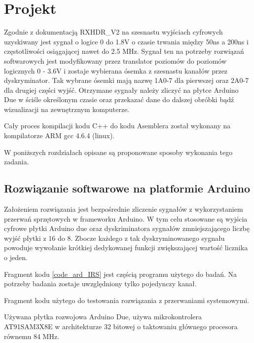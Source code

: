 \documentclass[a4paper,12pt]{article}
\begin{document}
\newpage
\section{Projekt}

Zgodnie z dokumentacją RXHDR\_V2 \cite{master} na szesnastu wyjściach cyfrowych uzyskiwany jest sygnał o logice 0 do 1.8V o czasie trwania między 50ns a 200ns i częstotliwości osiągającej nawet do 2.5 MHz.
Sygnał ten na potrzeby rozwiązań softwarowych jest modyfikowany przez translator poziomów do poziomów logicznych 0 - 3.6V i zostaje wybierana ósemka z szesnastu kanałów przez dyskryminator.   
Tak wybrane ósemki mają nazwę 1A0-7 dla pierwszej oraz 2A0-7 dla drugiej części wyjść.   
Otrzymane sygnały należy zliczyć na płytce Arduino Due w ściśle określonym czasie oraz przekazać dane do dalszej obróbki bądź wizualizacji na zewnętrznym komputerze.

Cały proces kompilacji kodu C++ do kodu Asemblera został wykonany na kompilatorze ARM gcc 4.6.4 (linux). 

W poniższych rozdziałach opisane są proponowane sposoby wykonania tego zadania. 

\subsection{Rozwiązanie softwarowe na platformie Arduino}
\label{dzial arduino}
Założeniem rozwiązania jest bezpośrednie zliczenie sygnałów z wykorzystaniem przerwań sprzętowych w frameworku Arduino. W tym celu stosowane są wyjścia cyfrowe płytki Arduino due oraz dyskriminatora sygnałów zmniejszającego liczbę wyjść płytki z 16 do 8.
Zbocze każdego z tak dyskryminowanego sygnału  powoduje wywołanie krótkiej dedykowanej funkcji zwiększającej wartość licznika o jeden. 

Fragment kodu \ref{code_ard_IRS} jest częścią programu użytego do badań. Na potrzeby badania zostaje uwzględniony tylko pojedynczy kanał.

\begin{kod}
        
        \caption{Fragment kodu użytego do testowania rozwiązania z przerwaniami systemowymi.}
        \label{code_ard_IRS}
\end{kod}


Używana płytka rozwojowa Arduino Due, używa mikrokontrolera AT91SAM3X8E w architekturze 32 bitowej o taktowaniu głównego procesora równemu 84 MHz.
\end{document}
